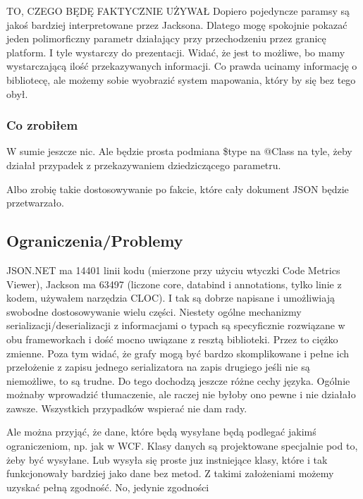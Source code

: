 TO, CZEGO BĘDĘ FAKTYCZNIE UŻYWAŁ
Dopiero pojedyncze paramsy są jakoś bardziej interpretowane przez Jacksona. Dlatego mogę spokojnie pokazać jeden polimorficzny parametr działający przy przechodzeniu przez granicę platform. I tyle wystarczy do prezentacji. Widać, że jest to możliwe, bo mamy wystarczającą ilość przekazywanych informacji. Co prawda ucinamy informację o bibliotecę, ale możemy sobie wyobrazić system mapowania, który by się bez tego obył.


\subsubsection{Co zrobiłem}
W sumie jeszcze nic. Ale będzie prosta podmiana \$type na @Class na tyle, żeby działał przypadek z przekazywaniem dziedziczącego parametru.

Albo zrobię takie dostosowywanie po fakcie, które cały dokument JSON będzie przetwarzało.


\subsection{Ograniczenia/Problemy}
JSON.NET ma 14401 linii kodu (mierzone przy użyciu wtyczki Code Metrics Viewer), Jackson ma 63497 (liczone core, databind i annotations, tylko linie z kodem, używałem narzędzia CLOC). I tak są dobrze napisane i umożliwiają swobodne dostosowywanie wielu części. Niestety ogólne mechanizmy serializacji/deserializacji z informacjami o typach są specyficznie rozwiązane w obu frameworkach i dość mocno uwiązane z resztą biblioteki. Przez to ciężko zmienne.
Poza tym widać, że grafy mogą być bardzo skomplikowane i pełne ich przełożenie z zapisu jednego serializatora na zapis drugiego jeśli nie są niemożliwe, to są trudne. Do tego dochodzą jeszcze różne cechy języka.
Ogólnie możnaby wprowadzić tłumaczenie, ale raczej nie byłoby ono pewne i nie działało zawsze.
Wszystkich przypadków wspierać nie dam rady.

Ale można przyjąć, że dane, które będą wysyłane będą podlegać jakimś ograniczeniom, np. jak w WCF. Klasy danych są projektowane specjalnie pod to, żeby być wysyłane. Lub wysyła się proste juz instniejące klasy, które i tak funkcjonowały bardziej jako dane bez metod.
Z takimi założeniami możemy uzyskać pełną zgodność. No, jedynie zgodności

